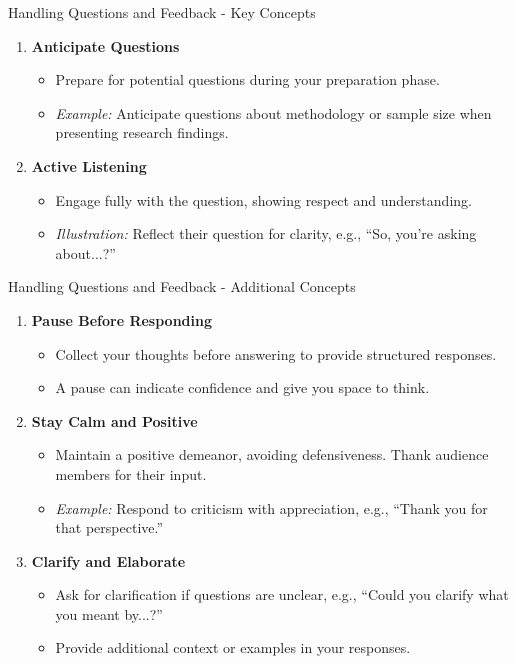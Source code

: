 \documentclass[aspectratio=169]{beamer}
\begin{document}
\begin{frame}[fragile]{Handling Questions and Feedback - Key Concepts}
    \begin{enumerate}
        \item \textbf{Anticipate Questions}
            \begin{itemize}
                \item Prepare for potential questions during your preparation phase.
                \item \textit{Example:} Anticipate questions about methodology or sample size when presenting research findings.
            \end{itemize}
        \item \textbf{Active Listening}
            \begin{itemize}
                \item Engage fully with the question, showing respect and understanding. 
                \item \textit{Illustration:} Reflect their question for clarity, e.g., “So, you’re asking about...?”
            \end{itemize}
    \end{enumerate}
\end{frame}

\begin{frame}[fragile]{Handling Questions and Feedback - Additional Concepts}
    \begin{enumerate}[resume]
        \item \textbf{Pause Before Responding}
            \begin{itemize}
                \item Collect your thoughts before answering to provide structured responses.
                \item A pause can indicate confidence and give you space to think.
            \end{itemize}
        \item \textbf{Stay Calm and Positive}
            \begin{itemize}
                \item Maintain a positive demeanor, avoiding defensiveness. Thank audience members for their input.
                \item \textit{Example:} Respond to criticism with appreciation, e.g., “Thank you for that perspective.”
            \end{itemize}
        \item \textbf{Clarify and Elaborate}
            \begin{itemize}
                \item Ask for clarification if questions are unclear, e.g., “Could you clarify what you meant by...?”
                \item Provide additional context or examples in your responses.
            \end{itemize}
    \end{enumerate}
\end{frame}
\end{document}
